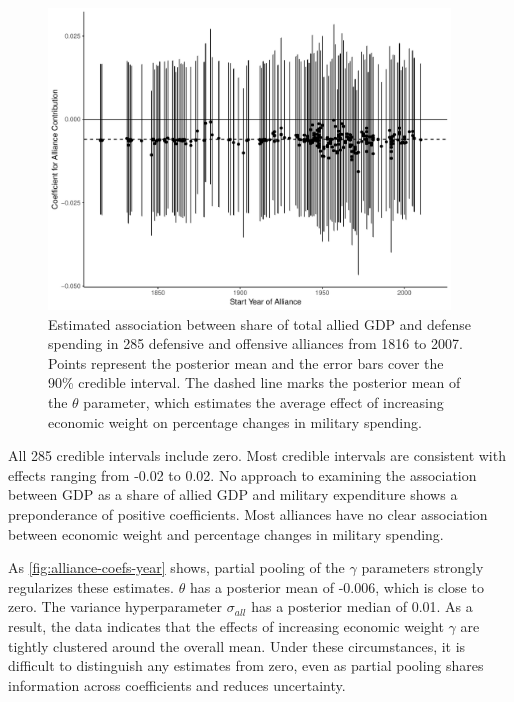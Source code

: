 \documentclass[12pt]{article}
\begin{document}
\begin{figure}[htbp]
	\centering
		\includegraphics[width=0.95\textwidth]{alliance-coefs-year.pdf}
	\caption{Estimated association between share of total allied GDP and defense spending in 285 defensive and offensive alliances from 1816 to 2007. Points represent the posterior mean and the error bars cover the 90\% credible interval. The dashed line marks the posterior mean of the $\theta$ parameter, which estimates the average effect of increasing economic weight on percentage changes in military spending.}
	\label{fig:alliance-coefs-year}
\end{figure}


All 285 credible intervals include zero. 
Most credible intervals are consistent with effects ranging from -0.02 to 0.02. 
No approach to examining the association between GDP as a share of allied GDP and military expenditure shows a preponderance of positive coefficients. 
Most alliances have no clear association between economic weight and percentage changes in military spending.


As \autoref{fig:alliance-coefs-year} shows, partial pooling of the $\gamma$ parameters strongly regularizes these estimates. 
$\theta$ has a posterior mean of -0.006, which is close to zero. 
The variance hyperparameter $\sigma_{all}$ has a posterior median of 0.01. 
As a result, the data indicates that the effects of increasing economic weight $\gamma$ are tightly clustered around the overall mean. 
Under these circumstances, it is difficult to distinguish any estimates from zero, even as partial pooling shares information across coefficients and reduces uncertainty. 
\end{document}
